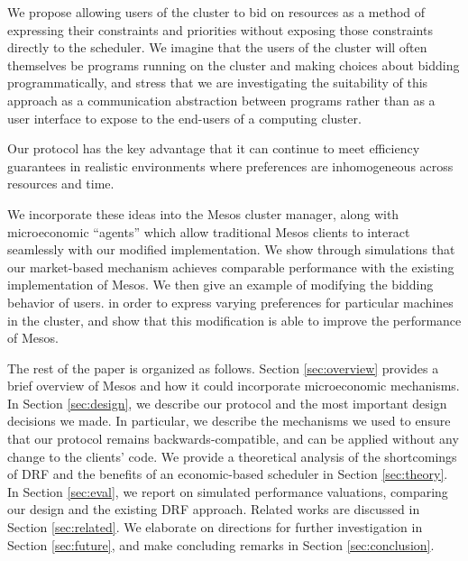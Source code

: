 \documentclass{acm_proc_article-sp}
\begin{document}
We propose allowing users of the cluster to bid on resources
as a method of expressing their constraints and priorities without exposing
those constraints directly to the scheduler. We imagine that the users
of the cluster will often themselves be programs running on the cluster
and making choices about bidding programmatically, and stress that we are
investigating the suitability of this approach as a communication abstraction
between programs rather than as a user interface to expose to the end-users
of a computing cluster.

Our protocol has the key advantage that it can continue to meet
efficiency guarantees in realistic environments where preferences are
inhomogeneous across resources and time.

We incorporate these ideas into the Mesos cluster manager, along with microeconomic
``agents'' which allow traditional Mesos clients to interact seamlessly with our
modified implementation. We show through simulations that our market-based mechanism 
achieves comparable performance with the existing implementation of Mesos.
We then give an example of modifying the bidding behavior of users.
in order to express varying preferences for particular machines in the cluster,
and show that this modification is able to improve the performance of Mesos.

The rest of the paper is organized as follows.
Section \ref{sec:overview} provides a brief overview of Mesos and how it
could incorporate microeconomic mechanisms.
%
%
In Section \ref{sec:design}, we describe our protocol and the most important design decisions
we made. In particular, we describe the mechanisms we used to ensure that our
protocol remains backwards-compatible, and can be applied without any change to
the clients' code.
%
We provide a theoretical analysis of the shortcomings of DRF and the benefits of an economic-based scheduler in Section \ref{sec:theory}.
%
In Section \ref{sec:eval}, we report on simulated performance valuations, comparing our
design and the existing DRF approach.
Related works are discussed in Section \ref{sec:related}.
We elaborate on directions for further investigation in Section \ref{sec:future}, and make concluding remarks in Section \ref{sec:conclusion}.
\end{document}
